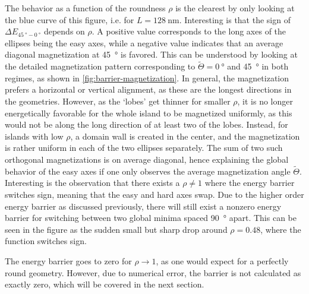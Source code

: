\documentclass[11pt,a4paper,english,twoside]{article}
\begin{document}
The behavior as a function of the roundness $\rho$ is the clearest by only looking at the blue curve of this figure, i.e. for $L=\SI{128}{\nano\metre}$. Interesting is that the sign of $\Delta E_{\SI{45}{\degree}-\SI{0}{\degree}}$ depends on $\rho$. A positive value corresponds to the long axes of the ellipses being the easy axes, while a negative value indicates that an average diagonal magnetization at \SI{45}{\degree} is favored. This can be understood by looking at the detailed magnetization pattern corresponding to $\widetilde{\Theta} = \SI{0}{\degree}$ and \SI{45}{\degree} in both regimes, as shown in \cref{fig:barrier-magnetization}. In general, the magnetization prefers a horizontal or vertical alignment, as these are the longest directions in the geometries. However, as the `lobes' get thinner for smaller $\rho$, it is no longer energetically favorable for the whole island to be magnetized uniformly, as this would not be along the long direction of at least two of the lobes. Instead, for islands with low $\rho$, a domain wall is created in the center, and the magnetization is rather uniform in each of the two ellipses separately. The sum of two such orthogonal magnetizations is on average diagonal, hence explaining the global behavior of the easy axes if one only observes the average magnetization angle $\widetilde{\Theta}$.
Interesting is the observation that there exists a $\rho \neq 1$ where the energy barrier switches sign, meaning that the easy and hard axes swap. Due to the higher order energy barrier as discussed previously, there will still exist a nonzero energy barrier for switching between two global minima spaced \SI{90}{\degree} apart. This can be seen in the figure as the sudden small but sharp drop around $\rho = 0.48$, where the function switches sign.

The energy barrier goes to zero for $\rho \rightarrow 1$, as one would expect for a perfectly round geometry. However, due to numerical error, the barrier is not calculated as exactly zero, which will be covered in the next section.
\end{document}
